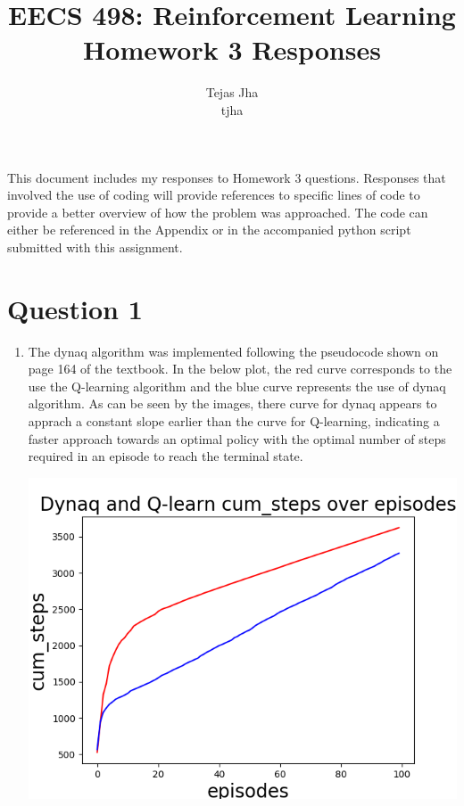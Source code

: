 \documentclass[11pt]{article}
\title{EECS 498: Reinforcement Learning \protect \\ Homework 3 Responses}
\author{Tejas Jha \\ tjha}
\begin{document}
\maketitle
This document includes my responses to Homework 3 questions. Responses that involved the use of coding will provide references to specific lines of code to provide a better overview of how the problem was approached. The code can either be referenced in the Appendix or in the accompanied python script submitted with this assignment.

\section*{Question 1}
\begin{enumerate}[label=(\alph*)]
\item
The dynaq algorithm was implemented following the pseudocode shown on page 164 of the textbook. In the below plot, the red curve corresponds to the use the Q-learning algorithm and the blue curve represents the use of dynaq algorithm. As can be seen by the images, there curve for dynaq appears to apprach a constant slope earlier than the curve for Q-learning, indicating a faster approach towards an optimal policy with the optimal number of steps required in an episode to reach the terminal state.

\includegraphics[scale=0.7]{Figure1.png}


\end{enumerate}
\end{document}
